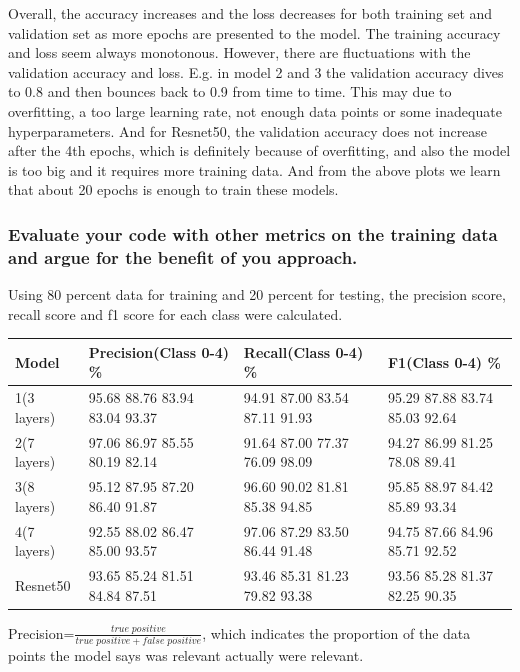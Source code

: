 \documentclass[12pt]{article}
\begin{document}
Overall, the accuracy increases and the loss decreases for both training set and validation set as more epochs are presented to the model. The training accuracy and loss seem always monotonous. However, there are fluctuations with the validation accuracy and loss. E.g. in model 2 and 3 the validation accuracy dives to 0.8 and then bounces back to 0.9 from time to time. This may due to overfitting, a too large learning rate, not enough data points or some inadequate hyperparameters. And for Resnet50, the validation accuracy does not increase after the 4th epochs, which is definitely because of overfitting, and also the model is too big and it requires more training data. And from the above plots we learn that about 20 epochs is enough to train these models.

\subsubsection{Evaluate your code with other metrics on the training data and argue for the benefit of you approach.}

Using 80 percent data for training and 20 percent for testing, the precision score, recall score and f1 score for each class were calculated.
\begin{center}
\small
\begin{tabular}{|p{1.8cm}|p{4.8cm}|p{4.8cm}|p{4.8cm}|}
\hline
\textbf{Model} & \textbf{Precision(Class 0-4) \%} & \textbf{Recall(Class 0-4) \%} & \textbf{F1(Class 0-4) \%}\\ 
\hline
1(3 layers) & 95.68 88.76 83.94 83.04 93.37 & 94.91 87.00 83.54 87.11 91.93 & 95.29 87.88 83.74 85.03 92.64\\ 
\hline
2(7 layers) & 97.06 86.97 85.55 80.19 82.14 & 91.64 87.00 77.37 76.09 98.09 & 94.27 86.99 81.25 78.08 89.41\\ 
\hline
3(8 layers) & 95.12 87.95 87.20 86.40 91.87 & 96.60 90.02 81.81 85.38 94.85 & 95.85 88.97 84.42 85.89 93.34\\ 
\hline
4(7 layers) & 92.55 88.02 86.47 85.00 93.57 & 97.06 87.29 83.50 86.44 91.48 & 94.75 87.66 84.96 85.71 92.52\\
\hline
Resnet50 & 93.65 85.24 81.51 84.84 87.51 & 93.46 85.31 81.23 79.82 93.38 & 93.56 85.28 81.37 82.25 90.35\\
\hline
\end{tabular}
\end{center}

Precision=$\frac{true\;positive}{true\;positive+false\;positive}$, which indicates the proportion of the data points the model says was relevant actually were relevant.
\end{document}

